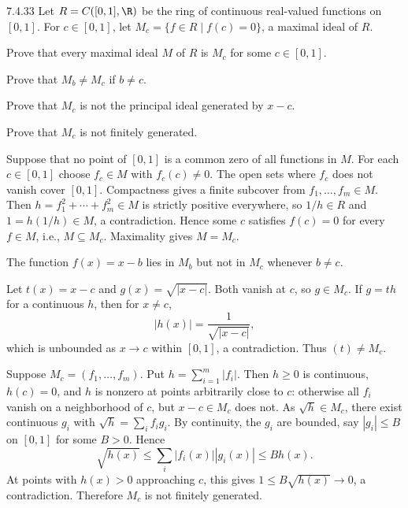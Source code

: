 \documentclass[11pt,oneside]{article}
\begin{document}
\begin{exercise}{7.4.33}
Let $R=C([0,1],\R)$ be the ring of continuous real-valued functions on $[0,1]$. For $c\in[0,1]$, let $M_c=\{f\in R\mid f(c)=0\}$, a maximal ideal of $R$.
\begin{exercisesubparts}
\item Prove that every maximal ideal $M$ of $R$ is $M_c$ for some $c\in[0,1]$.
\item Prove that $M_b\ne M_c$ if $b\ne c$.
\item Prove that $M_c$ is not the principal ideal generated by $x-c$.
\item Prove that $M_c$ is not finitely generated.
\end{exercisesubparts}
\end{exercise}
\begin{solution}
\begin{exercisesubparts}
\item Suppose that no point of $[0,1]$ is a common zero of all functions in $M$. For each $c\in[0,1]$ choose $f_c\in M$ with $f_c(c)\ne0$. The open sets where $f_c$ does not vanish cover $[0,1]$. Compactness gives a finite subcover from $f_1,\ldots,f_m\in M$. Then $h=f_1^2+\cdots+f_m^2\in M$ is strictly positive everywhere, so $1/h\in R$ and $1=h(1/h)\in M$, a contradiction. Hence some $c$ satisfies $f(c)=0$ for every $f\in M$, i.e., $M\subseteq M_c$. Maximality gives $M=M_c$.
\item The function $f(x)=x-b$ lies in $M_b$ but not in $M_c$ whenever $b\ne c$.
\item Let $t(x)=x-c$ and $g(x)=\sqrt{|x-c|}$. Both vanish at $c$, so $g\in M_c$. If $g=th$ for a continuous $h$, then for $x\ne c$,
\[
|h(x)|=\frac1{\sqrt{|x-c|}},
\]
which is unbounded as $x\to c$ within $[0,1]$, a contradiction. Thus $(t)\ne M_c$.
\item Suppose $M_c=(f_1,\ldots,f_m)$. Put $h=\sum_{i=1}^m|f_i|$. Then $h\ge0$ is continuous, $h(c)=0$, and $h$ is nonzero at points arbitrarily close to $c$: otherwise all $f_i$ vanish on a neighborhood of $c$, but $x-c\in M_c$ does not. As $\sqrt h\in M_c$, there exist continuous $g_i$ with $\sqrt h=\sum_i f_i g_i$. By continuity, the $g_i$ are bounded, say $|g_i|\le B$ on $[0,1]$ for some $B>0$. Hence
\[
\sqrt{h(x)}\le\sum_i|f_i(x)||g_i(x)|\le B h(x).
\]
At points with $h(x)>0$ approaching $c$, this gives $1\le B\sqrt{h(x)}\to0$, a contradiction. Therefore $M_c$ is not finitely generated.
\end{exercisesubparts}
\end{solution}
\end{document}
